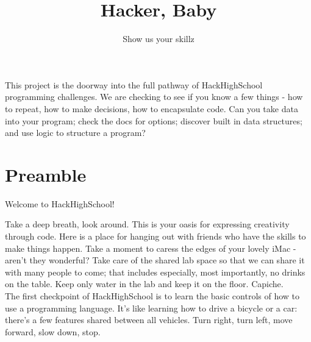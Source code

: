 \documentclass{42-en}
\begin{document}
\title{Hacker, Baby}
\subtitle{Show us your skillz}


\summary
{
This project is the doorway into the full pathway of HackHighSchool programming challenges. We are checking to see if you know a few things - how to repeat, how to make decisions, how to encapsulate code. Can you take data into your program; check the docs for options; discover built in data structures; and use logic to structure a program?
}

\maketitle

\tableofcontents





\chapter{Preamble}

Welcome to HackHighSchool!

Take a deep breath, look around. This is your oasis for expressing creativity through code. Here is a place for hanging out with 
friends who have the skills to make things happen. Take a moment to caress the edges of your lovely iMac - aren't they wonderful? Take care of the shared lab space so that we can share it with many people to come;
that includes especially, most importantly, no drinks on the table. Keep only water in the lab and keep it on the
floor. Capiche.\\

The first checkpoint of HackHighSchool is to learn the basic controls of how to use a programming language. It's
like learning how to drive a bicycle or a car: there's a few features shared between all vehicles. Turn right,
turn left, move forward, slow down, stop.\\
\end{document}
